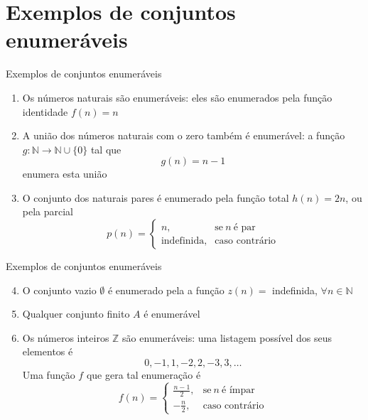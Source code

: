 \section{Exemplos de conjuntos enumeráveis}

\begin{frame}[fragile]{Exemplos de conjuntos enumeráveis}

    \begin{enumerate}
        \item Os números naturais são enumeráveis: eles são enumerados pela função identidade
            $f(n) = n$

        \item A união dos números naturais com o zero também é enumerável: a função 
            $g:\mathbb{N}\to \mathbb{N}\cup \lbrace 0\rbrace$ tal que
            \[
                g(n) = n - 1
            \]
            enumera esta união

        \item O conjunto dos naturais pares é enumerado pela função total $h(n) = 2n$, ou
            pela parcial
            \[
                p(n) = \left\lbrace \begin{array}{ll}
                            n, & \mbox{se}\ n\ \mbox{é par} \\
                            \mbox{indefinida}, & \mbox{caso contrário}
                        \end{array}\right.
            \]
    \end{enumerate}

\end{frame}

\begin{frame}[fragile]{Exemplos de conjuntos enumeráveis}

    \begin{enumerate}
        \setcounter{enumi}{3}
        \item O conjunto vazio $\emptyset$ é enumerado pela a função $z(n) =$ indefinida,
            $\forall n\in \mathbb{N}$ 

        \item Qualquer conjunto finito $A$ é enumerável

        \item Os números inteiros $\mathbb{Z}$ são enumeráveis: uma listagem possível dos seus
        elementos é
        \[
            0, -1, 1, -2, 2, -3, 3, \ldots
        \]
        Uma função $f$ que gera tal enumeração é 
        \[
            f(n) = \left\lbrace \begin{array}{ll}
                        \frac{n - 1}{2}, & \mbox{se}\ n\ \mbox{é ímpar} \\
                        -\frac{n}{2}, & \mbox{caso contrário}
                    \end{array}\right.
        \]

    \end{enumerate}

\end{frame}

